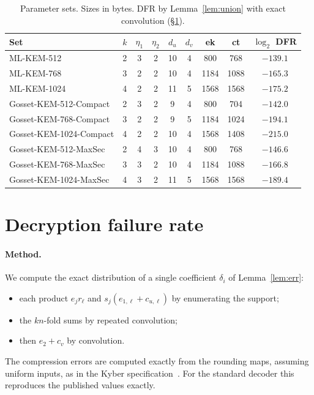 \documentclass[11pt,a4paper]{article}
\theoremstyle{definition}
\theoremstyle{remark}
\newcommand{\lt}{\log_2}
\begin{document}
\begin{table}[t]\centering\small
\caption{Parameter sets. Sizes in bytes. DFR by Lemma~\ref{lem:union} with exact convolution (\S\ref{sec:dfr}).}\label{tab:params}
\begin{tabular}{lcccccccc}\toprule
Set & $k$ & $\eta_1$ & $\eta_2$ & $d_u$ & $d_v$ & ek & ct & $\lt$ DFR\\\midrule
ML-KEM-512 & 2 & 3 & 2 & 10 & 4 & 800 & 768 & $-139.1$\\
ML-KEM-768 & 3 & 2 & 2 & 10 & 4 & 1184 & 1088 & $-165.3$\\
ML-KEM-1024 & 4 & 2 & 2 & 11 & 5 & 1568 & 1568 & $-175.2$\\\midrule
Gosset-KEM-512-Compact & 2 & 3 & 2 & 9 & 4 & 800 & 704 & $-142.0$\\
Gosset-KEM-768-Compact & 3 & 2 & 2 & 9 & 5 & 1184 & 1024 & $-194.1$\\
Gosset-KEM-1024-Compact & 4 & 2 & 2 & 10 & 4 & 1568 & 1408 & $-215.0$\\\midrule
Gosset-KEM-512-MaxSec & 2 & 4 & 3 & 10 & 4 & 800 & 768 & $-146.6$\\
Gosset-KEM-768-MaxSec & 3 & 3 & 2 & 10 & 4 & 1184 & 1088 & $-166.8$\\
Gosset-KEM-1024-MaxSec & 4 & 3 & 2 & 11 & 5 & 1568 & 1568 & $-189.4$\\\bottomrule
\end{tabular}
\end{table}

\section{Decryption failure rate}\label{sec:dfr}

\paragraph{Method.} We compute the exact distribution of a single coefficient $\delta_i$ of Lemma~\ref{lem:err}:
\begin{itemize}[leftmargin=*,itemsep=1pt]
\item each product $e_jr_\ell$ and $s_j(e_{1,\ell}+c_{u,\ell})$ by enumerating the support;
\item the $kn$-fold sums by repeated convolution;
\item then $e_2+c_v$ by convolution.
\end{itemize}
The compression errors are computed exactly from the rounding maps, assuming uniform inputs, as in the Kyber specification~\cite{kyber}. For the standard decoder this reproduces the published values exactly.
\end{document}
